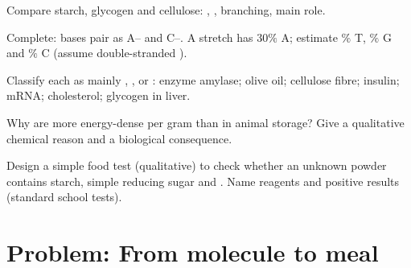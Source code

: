 \begin{exercise}[$\star\star$]\label{exo:g10:molecules-of-life:7}
Compare starch, glycogen and cellulose: , , branching,
main role.
\end{exercise}

\begin{exercise}[$\star\star$]\label{exo:g10:molecules-of-life:8}
Complete:  bases pair as A--\underline{\hspace{1em}} and
C--\underline{\hspace{1em}}. A  stretch has $30\%$ A; estimate $\%$ T,
$\%$ G and $\%$ C (assume double-stranded ).
\end{exercise}

\begin{exercise}[$\star\star$]\label{exo:g10:molecules-of-life:9}
Classify each as mainly , ,  or :
enzyme amylase; olive oil; cellulose fibre; insulin; mRNA; cholesterol;
glycogen in liver.
\end{exercise}

\begin{exercise}[$\star\star\star$]\label{exo:g10:molecules-of-life:10}
Why are  more energy-dense per gram than  in animal
storage? Give a qualitative chemical reason and a biological consequence.
\end{exercise}

\begin{exercise}[$\star\star\star$]\label{exo:g10:molecules-of-life:11}
Design a simple food test  (qualitative) to check whether an
unknown powder contains starch, simple reducing sugar and . Name
reagents and positive results (standard school tests).
\end{exercise}

\section{Problem: From molecule to meal}

